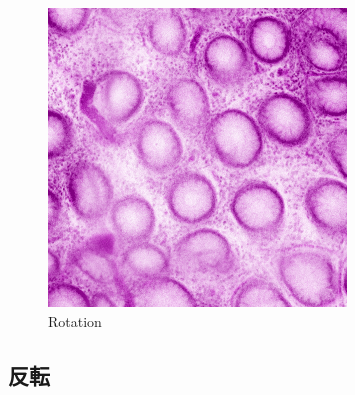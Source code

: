 \begin{figure}[H]
\begin{minipage}{0.24\columnwidth}
		\subcaption{180\deg}
	\end{minipage}
	\begin{minipage}{0.24\columnwidth}
		\centering
		\includegraphics[clip, width=\linewidth]{fig/preprocessing/data_aug/rotate/ROTATION_270}
		\subcaption{270\deg}
	\end{minipage}
	
	\caption{Rotation}
	\label{fig:回転}
	
\end{figure}


\subsection*{反転}

